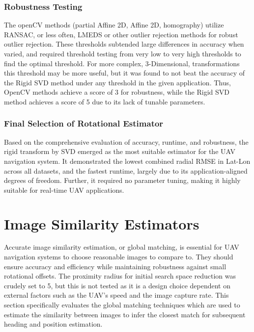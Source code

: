     

\subsubsection*{Robustness Testing}

The openCV methods (partial Affine 2D, Affine 2D, homography) utilize RANSAC, or less often, LMEDS or other outlier rejection methods for robust outlier rejection. These thresholds subtended large differences in accuracy when varied, and required threshold testing from very low to very high thresholds to find the optimal threshold. For more complex, 3-Dimensional, transformations this threshold may be more useful, but it was found to not beat the accuracy of the Rigid SVD method under any threshold in the given application. Thus, OpenCV methods achieve a score of 3 for robustness, while the Rigid SVD method achieves a score of 5 due to its lack of tunable parameters. 

\subsubsection*{Final Selection of Rotational Estimator}

Based on the comprehensive evaluation of accuracy, runtime, and robustness, the rigid transform by SVD emerged as the most suitable estimator for the UAV navigation system. It demonstrated the lowest combined radial RMSE in Lat-Lon across all datasets, and the fastest runtime, largely due to its application-aligned degrees of freedom. Further, it required no parameter tuning, making it highly suitable for real-time UAV applications.




\vspace{-0.5cm}
\section{Image Similarity Estimators}
\vspace{-0.25cm}

Accurate image similarity estimation, or global matching, is essential for UAV navigation systems to choose reasonable images to compare to. They should ensure accuracy and efficiency while maintaining robustness against small rotational offsets. The proximity radius for initial search space reduction was crudely set to 5, but this is not tested as it is a design choice dependent on external factors such as the UAV's speed and the image capture rate. This section specifically evaluates the global matching techniques which are used to estimate the similarity between images to infer the closest match for subsequent heading and position estimation. 


